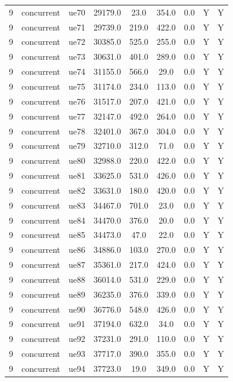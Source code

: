\begin{table}[ht]
\begin{tabular}{|c|c|c|c|c|c|c|c|c|}
9 & concurrent & ue70 & 29179.0 & 23.0 & 354.0 & 0.0 & Y & Y \\
9 & concurrent & ue71 & 29739.0 & 219.0 & 422.0 & 0.0 & Y & Y \\
9 & concurrent & ue72 & 30385.0 & 525.0 & 255.0 & 0.0 & Y & Y \\
9 & concurrent & ue73 & 30631.0 & 401.0 & 289.0 & 0.0 & Y & Y \\
9 & concurrent & ue74 & 31155.0 & 566.0 & 29.0 & 0.0 & Y & Y \\
9 & concurrent & ue75 & 31174.0 & 234.0 & 113.0 & 0.0 & Y & Y \\
9 & concurrent & ue76 & 31517.0 & 207.0 & 421.0 & 0.0 & Y & Y \\
9 & concurrent & ue77 & 32147.0 & 492.0 & 264.0 & 0.0 & Y & Y \\
9 & concurrent & ue78 & 32401.0 & 367.0 & 304.0 & 0.0 & Y & Y \\
9 & concurrent & ue79 & 32710.0 & 312.0 & 71.0 & 0.0 & Y & Y \\
9 & concurrent & ue80 & 32988.0 & 220.0 & 422.0 & 0.0 & Y & Y \\
9 & concurrent & ue81 & 33625.0 & 531.0 & 426.0 & 0.0 & Y & Y \\
9 & concurrent & ue82 & 33631.0 & 180.0 & 420.0 & 0.0 & Y & Y \\
9 & concurrent & ue83 & 34467.0 & 701.0 & 23.0 & 0.0 & Y & Y \\
9 & concurrent & ue84 & 34470.0 & 376.0 & 20.0 & 0.0 & Y & Y \\
9 & concurrent & ue85 & 34473.0 & 47.0 & 22.0 & 0.0 & Y & Y \\
9 & concurrent & ue86 & 34886.0 & 103.0 & 270.0 & 0.0 & Y & Y \\
9 & concurrent & ue87 & 35361.0 & 217.0 & 424.0 & 0.0 & Y & Y \\
9 & concurrent & ue88 & 36014.0 & 531.0 & 229.0 & 0.0 & Y & Y \\
9 & concurrent & ue89 & 36235.0 & 376.0 & 339.0 & 0.0 & Y & Y \\
9 & concurrent & ue90 & 36776.0 & 548.0 & 426.0 & 0.0 & Y & Y \\
9 & concurrent & ue91 & 37194.0 & 632.0 & 34.0 & 0.0 & Y & Y \\
9 & concurrent & ue92 & 37231.0 & 291.0 & 110.0 & 0.0 & Y & Y \\
9 & concurrent & ue93 & 37717.0 & 390.0 & 355.0 & 0.0 & Y & Y \\
9 & concurrent & ue94 & 37723.0 & 19.0 & 349.0 & 0.0 & Y & Y \\

\end{tabular}
\end{table}
